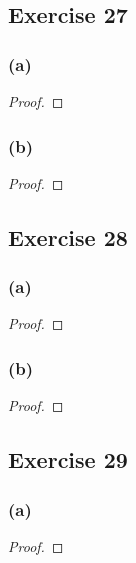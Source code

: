 \documentclass[14pt]{extarticle}
\begin{document}
\subsection{Exercise 27}

\subsubsection{(a)}

\begin{proof}

\end{proof}

\subsubsection{(b)}

\begin{proof}

\end{proof}

\subsection{Exercise 28}

\subsubsection{(a)}

\begin{proof}

\end{proof}

\subsubsection{(b)}

\begin{proof}

\end{proof}

\subsection{Exercise 29}

\subsubsection{(a)}

\begin{proof}

\end{proof}
\end{document}
